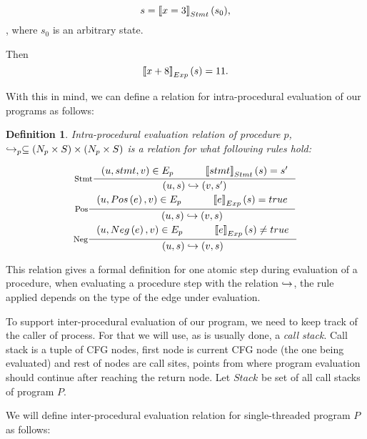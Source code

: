 \documentclass[..thesis.tex]{subfiles}
\newtheorem{defin}{Definition}[section]
\begin{document}
\begin{equation*}
s = \left\llbracket x = 3 \right\rrbracket_{Stmt} (s_0) \text{,}
\end{equation*},
where $s_0$ is an arbitrary state. 

Then 
\begin{equation*}
\left\llbracket x + 8 \right\rrbracket_{Exp} \left( s \right) = 11 \text{.}    
\end{equation*}

With this in mind, we can define a relation for intra-procedural evaluation of our programs as follows:

\begin{defin}
Intra-procedural evaluation relation of procedure $p$, $\hookrightarrow_p \subseteq  \left( N_p  \times S \right)  \times \left( N_p \times S \right)$ is a relation for what following rules hold:

\addtolength{\jot}{2em}
\begin{gather*}
  \inference[Stmt]{ \lp u, stmt, v \rp \in E_{p}  \separ  \lllb stmt \rrrb_{Stmt} \lp s \rp = s'}{\lp u, s \rp \intraproc \lp v, s' \rp} \\
  \inference[Pos]{ \lp u, Pos \lp e \rp , v \rp \in E_{p} \separ \lllb e \rrrb_{Exp} \lp s \rp = true }{\lp u, s \rp \intraproc \lp v, s \rp} \\  
  \inference[Neg]{ \lp u, Neg \lp e \rp , v \rp \in E_{p} \separ \lllb e \rrrb_{Exp} \lp s \rp \neq true }{\lp u, s \rp \intraproc \lp v, s \rp} 
\end{gather*}
\addtolength{\jot}{-2em}

\end{defin}

This relation gives a formal definition for one atomic step during evaluation of a procedure, when evaluating a procedure step with the relation $\hookrightarrow$, the rule applied depends on the type of the edge under evaluation. 


To support inter-procedural evaluation of our program, we need to keep track of the caller of process. For that we will use, as is usually done, a \textit{call stack}. Call stack is a tuple of CFG nodes, first node is current CFG node (the one being evaluated) and rest of nodes are call sites, points from where program evaluation should continue after reaching the return node. Let $Stack$ be set of all call stacks of program $P$. 

We will define inter-procedural evaluation relation for single-threaded program $P$ as follows:
\end{document}
